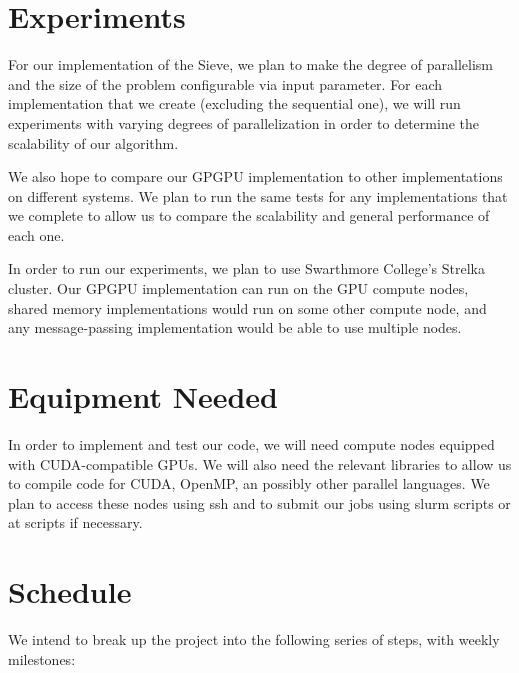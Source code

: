 \documentclass[11pt]{article}
\begin{document}
\section {Experiments}\label{exper}

For our implementation of the Sieve, we plan to make the degree of parallelism
and the size of the problem configurable via input parameter. For each
implementation that we create (excluding the sequential one), we will run
experiments with varying degrees of parallelization in order to determine
the scalability of our algorithm.

We also hope to compare our GPGPU implementation to other implementations on
different systems. We plan to run the same tests for any implementations that we
complete to allow us to compare the scalability and general performance of each
one.

In order to run our experiments, we plan to use Swarthmore College's Strelka
cluster. Our GPGPU implementation can run on the GPU compute nodes, shared
memory implementations would run on some other compute node, and any
message-passing implementation would be able to use multiple nodes.

\section {Equipment Needed}\label{equip}

In order to implement and test our code, we will need compute nodes
equipped with CUDA-compatible GPUs. We will also need the relevant
libraries to allow us to compile code for CUDA, OpenMP, an possibly
other parallel languages. We plan to access these nodes using ssh and
to submit our jobs using slurm scripts or at scripts if necessary.

\section {Schedule}\label{sched}
\noindent We intend to break up the project into the following series of steps, with weekly 
milestones:
\end{document}
